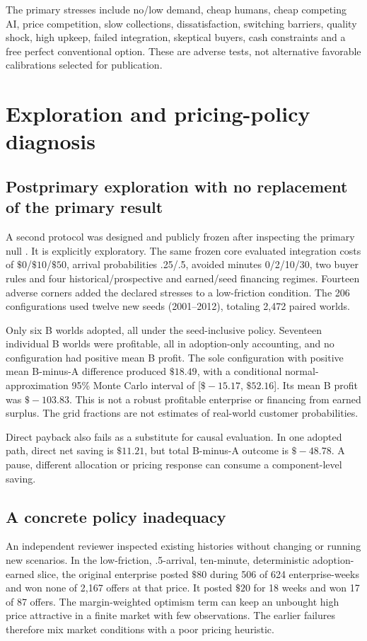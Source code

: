 \documentclass[11pt,a4paper]{article}
\newcommand{\money}[1]{\(\$#1\)}
\begin{document}
The primary stresses include no/low demand, cheap humans, cheap competing AI, price competition,
slow collections, dissatisfaction, switching barriers, quality shock, high upkeep, failed
integration, skeptical buyers, cash constraints and a free perfect conventional option.
These are adverse tests, not alternative favorable calibrations selected for publication.

\section{Exploration and pricing-policy diagnosis}
\subsection{Postprimary exploration with no replacement of the primary result}
A second protocol was designed and publicly frozen after inspecting the primary null
\cite{exploratoryfreeze}. It is explicitly exploratory. The same frozen core evaluated integration
costs of \money{0}/\money{10}/\money{50}, arrival probabilities .25/.5, avoided minutes
0/2/10/30, two buyer rules and four historical/prospective and earned/seed financing regimes.
Fourteen adverse corners added the declared stresses to a low-friction condition.
The 206 configurations used twelve new seeds (2001--2012), totaling 2,472 paired worlds.

Only six B worlds adopted, all under the seed-inclusive policy. Seventeen individual B worlds were profitable,
all in adoption-only accounting, and no configuration had positive mean B profit.
The sole configuration with positive mean B-minus-A difference produced \money{18.49}, with
a conditional normal-approximation 95\% Monte Carlo interval of
[\money{-15.17}, \money{52.16}]. Its mean B profit was \money{-103.83}.
This is not a robust profitable enterprise or financing from earned surplus.
The grid fractions are not estimates of real-world customer probabilities.

Direct payback also fails as a substitute for causal evaluation. In one adopted path, direct
net saving is \money{11.21}, but total B-minus-A outcome is \money{-48.78}.
A pause, different allocation or pricing response can consume a component-level saving.

\subsection{A concrete policy inadequacy}
An independent reviewer inspected existing histories without changing or running new scenarios.
In the low-friction, .5-arrival, ten-minute, deterministic adoption-earned slice, the original
enterprise posted \money{80} during 506 of 624 enterprise-weeks and won none of 2,167 offers at
that price. It posted \money{20} for 18 weeks and won 17 of 87 offers.
The margin-weighted optimism term can keep an unbought high price attractive in a finite
market with few observations. The earlier failures therefore mix market conditions with a poor
pricing heuristic.
\end{document}
